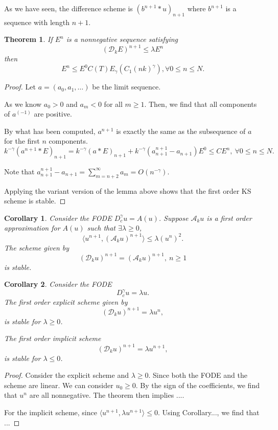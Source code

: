 \documentclass[11pt]{article} %
\newtheorem{thm}{Theorem}
\newtheorem{cor}{Corollary}
\begin{document}
As we have seen, the difference scheme is $(b^{n+1}*u)_{n+1}$ where $b^{n+1}$ is a sequence with length $n+1$. 

\begin{thm}
If $E^n$ is a nonnegative sequence satisfying $$
(\mathscr{D}_kE)^{n+1}\le \lambda E^n
$$
then $$
E^n\le E^0 C(T)E_{\gamma}(C_1(nk)^{\gamma}), \forall 0\le n\le N.
$$
\end{thm}

\begin{proof}
Let $a=(a_0, a_1,\ldots)$ be the limit sequence.

As we know $a_0>0$ and $a_m<0$ for all $m\ge 1$. Then, we find that all components of $a^{(-1)}$ are positive.

By what has been computed, $a^{n+1}$ is exactly the same as the subsequence of $a$ for the first $n$ components. $$
k^{-\gamma}(a^{n+1}*E)_{n+1}=k^{-\gamma}(a*E)_{n+1}+k^{-\gamma}(a_{n+1}^{n+1}-a_{n+1})E^0\le CE^{n},\ \forall 0\le n\le N.
$$

Note that $a_{n+1}^{n+1}-a_{n+1}=\sum_{m=n+2}^{\infty}a_m=O(n^{-\gamma})$.

Applying the variant version of the lemma above shows that the first order KS scheme is stable.
\end{proof}

\begin{cor}
Consider the FODE $D_c^{\gamma}u=A(u)$. Suppose $\mathscr{A}_ku$ is a first order approximation for $A(u)$ such that $\exists\lambda\ge 0$, $$
\langle u^{n+1}, (\mathscr{A}_ku)^{n+1}\rangle\le \lambda(u^{n})^2.
$$
The scheme given by
$$
(\mathcal{D}_ku)^{n+1}=(\mathscr{A}_ku)^{n+1}, \ n\ge 1
$$
is stable.
\end{cor}

\begin{cor}
Consider the FODE $$
D_c^{\gamma}u=\lambda u.
$$
The first order explicit scheme given by $$
(\mathscr{D}_ku)^{n+1}=\lambda u^n,
$$
is stable for $\lambda\ge 0$.

The first order implicit scheme 
$$
(\mathscr{D}_ku)^{n+1}=\lambda u^{n+1},
$$
is stable for $\lambda\le 0$.
\end{cor}
\begin{proof}
Consider the explicit scheme and $\lambda\ge 0$. Since both the FODE and the scheme are linear. We can consider $u_0\ge 0$.
By the sign of the coefficients, we find that $u^n$ are all nonnegative.
The theorem then implies ....

For the implicit scheme, since $\langle u^{n+1}, \lambda u^{n+1}\rangle\le 0$. Using Corollary..., we find that ...
\end{proof}
\end{document}

